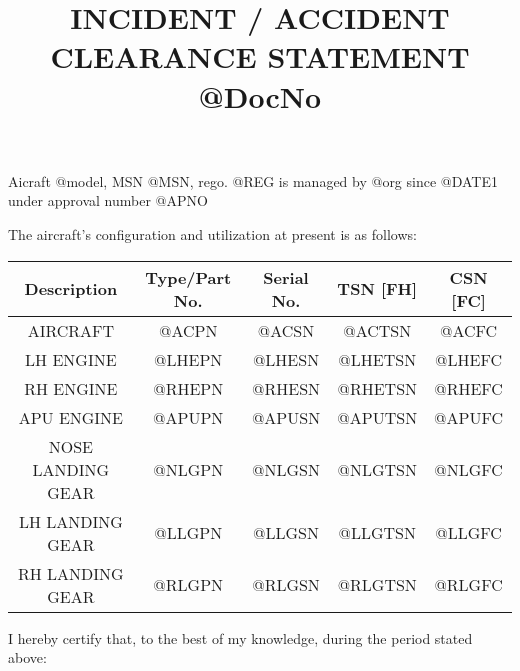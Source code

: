 \documentclass{article}
\title{INCIDENT / ACCIDENT CLEARANCE STATEMENT \\[1ex] @DocNo}
\date{}
\author{}
\begin{document}
\maketitle

\justifying
Aicraft @model, MSN @MSN, rego. @REG is managed by @org since @DATE1 under approval number @APNO
\par
The aircraft's configuration and utilization at present is as follows:
\vspace{20pt}

\begin{center}
    \begin{tabular}{|c|c|c|c|c|}
        \hline
         \textbf{Description} & \textbf{Type/Part No.} & \textbf{Serial No.} & \textbf{TSN [FH]} & \textbf{CSN [FC]}\\
         \hline
         AIRCRAFT & @ACPN & @ACSN & @ACTSN & @ACFC \\
         \hline
         LH ENGINE & @LHEPN & @LHESN & @LHETSN & @LHEFC \\
         \hline
         RH ENGINE & @RHEPN & @RHESN & @RHETSN & @RHEFC \\
         \hline
         APU ENGINE & @APUPN & @APUSN & @APUTSN & @APUFC \\
         \hline
         NOSE LANDING GEAR & @NLGPN & @NLGSN & @NLGTSN & @NLGFC \\
         \hline
         LH LANDING GEAR & @LLGPN & @LLGSN & @LLGTSN & @LLGFC \\
         \hline
         RH LANDING GEAR & @RLGPN & @RLGSN & @RLGTSN & @RLGFC \\
         \hline
    \end{tabular}
\end{center}

\vspace{20pt}

 I hereby certify that, to the best of my knowledge, during the period stated above:

 \vspace{10pt}
\end{document}

